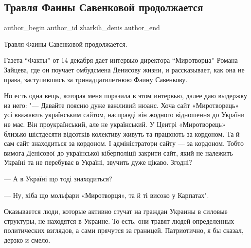  
 
 
 
 
 
\subsection{Травля Фаины Савенковой продолжается}
\label{sec:15_12_2021.fb.zharkih_denis.1.travlja_savenkova_prodolzhaetsja}
 
\ifcmt
 author_begin
   author_id zharkih_denis
 author_end
\fi

Травля Фаины Савенковой продолжается.

Газета \enquote{Факты} от 14 декабря дает интервью директора
\enquote{Миротворца} Романа Зайцева, где он поучает омбудсмена Денисову жизни,
и рассказывает, как она не права, заступившись за тринадцатилетнюю Фаину
Савенкову. 

Но есть одна вещь, которая меня поразила в этом интервью, далее даю выдержку из
него: "— Давайте поясню дуже важливий нюанс. Хоча сайт «Миротворець» усі
вважають українським сайтом, насправді він жодного відношення до України не
має. Він проукраїнський, але не український. У Центрі «Миротворець» близько
шістдесяти відсотків колективу живуть та працюють за кордоном. Та й сам сайт
знаходиться за кордоном. І адміністратори сайту — за кордоном. Тобто вимога
Денісової до української кіберполіції закрити сайт, який не належить Україні та
не перебуває в Україні, звучить дуже цікаво. Згодні?

— А в Україні що тоді знаходиться?

— Ну, хіба що мольфари «Миротворця», та й ті високо у Карпатах".

Оказывается люди, которые активно стучат на граждан Украины  в силовые
структуры, не находятся в Украине. То есть, они травят людей определенных
политических взглядов, а сами прячутся за границей. Патриотично, я бы сказал,
дерзко и смело. 

